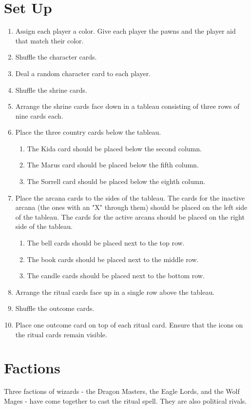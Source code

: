 \documentclass[10pt, parskip=half-, twoside]{scrartcl}
\begin{document}
\section*{Set Up}
\begin{enumerate}
	\item Assign each player a color. Give each player the pawns and the player aid that match their color.
	\item Shuffle the character cards.
	\item Deal a random character card to each player.

	\item Shuffle the shrine cards.
	\item Arrange the shrine cards face down in a tableau consisting of three rows of nine cards each.
	\item Place the three country cards below the tableau.
	\begin{enumerate}
		\item The Kida card should be placed below the second column.
		\item The Marus card should be placed below the fifth column.
		\item The Sorrell card should be placed below the eighth column.
	\end{enumerate}
	\item Place the arcana cards to the sides of the tableau. The cards for the inactive arcana (the ones with an "X" through them) should be placed on the left side of the tableau. The cards for the active arcana should be placed on the right side of the tableau.
	\begin{enumerate}
		\item The bell cards should be placed next to the top row.
		\item The book cards should be placed next to the middle row.
		\item The candle cards should be placed next to the bottom row.
	\end{enumerate}
	\item Arrange the ritual cards face up in a single row above the tableau.
	\item Shuffle the outcome cards.
	\item Place one outcome card on top of each ritual card. Ensure that the icons on the ritual cards remain visible.
\end{enumerate}

\newpage

\section*{Factions}
Three factions of wizards - the Dragon Masters, the Eagle Lords, and the Wolf Mages - have come together to cast the ritual spell. They are also political rivals.
\end{document}
